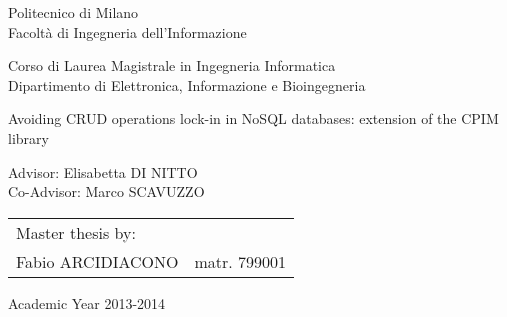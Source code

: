 \begin{titlepage}
\vspace*{-2.5cm}
\bfseries

\begin{center}
\LARGE
Politecnico di Milano\\
\Large
Facolt\`{a} di Ingegneria dell'Informazione\\
\vspace{0.5cm}

\begin{large}
Corso di Laurea Magistrale in Ingegneria Informatica\\
Dipartimento di Elettronica, Informazione e Bioingegneria\\
\end{large}

\vspace{1.0cm}
\begin{Large}
Avoiding CRUD operations lock-in in NoSQL databases: extension of the CPIM library
\end{Large}  
\end{center}

\vspace*{4.5cm}
\large
\begin{flushleft}
\hspace{-2cm}  Advisor: Elisabetta DI NITTO\\
\hspace{-2cm}  Co-Advisor: Marco SCAVUZZO\\
\end{flushleft}
\vspace*{1.5cm}

\hspace{5.5cm}
\parbox{10cm}{
    \begin{tabular}{ll}
         Master thesis by: & \\
         Fabio ARCIDIACONO & matr. 799001\\
    \end{tabular}
}

\vspace*{1.5cm}
\begin{center}
  Academic Year 2013-2014
\end{center}

\end{titlepage}
\cleardoublepage

\thispagestyle{empty}

